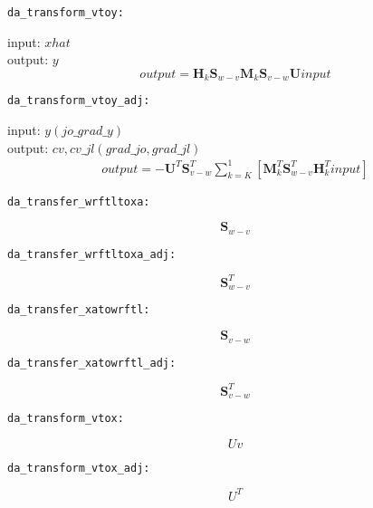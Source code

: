 \documentclass[a4paper,12pt,titlepage]{article}
\begin{document}
\begin{verbatim}
da_transform_vtoy:
\end{verbatim} 
input: $xhat$\\
output: $y$
\[
output=\mathbf{H}_k\mathbf{S}_{w-v}\mathbf{M}_k\mathbf{S}_{v-w}\mathbf{U}input
\]

\begin{verbatim}
da_transform_vtoy_adj:
\end{verbatim} 
input: $y (jo\_grad\_y)$\\
output: $cv ,cv\_jl (grad\_jo, grad\_jl)$
\begin{align*}
output=-\mathbf{U}^T\mathbf{S}^T_{v-w}\sum_{k=K}^1[\mathbf{M}^T_k\mathbf{S}^T_{w-v}\mathbf{H}^T_kinput]
\end{align*}

\begin{verbatim}
da_transfer_wrftltoxa:
\end{verbatim} 
\[
\mathbf{S}_{w-v}
\] 

\begin{verbatim}
da_transfer_wrftltoxa_adj:
\end{verbatim} 
\[
\mathbf{S}^T_{w-v}
\] 

\begin{verbatim}
da_transfer_xatowrftl:
\end{verbatim} 
\[
\mathbf{S}_{v-w}
\] 

\begin{verbatim}
da_transfer_xatowrftl_adj:
\end{verbatim} 
\[
\mathbf{S}^T_{v-w}
\] 

\begin{verbatim}
da_transform_vtox:
\end{verbatim} 
\[
Uv
\] 

\begin{verbatim}
da_transform_vtox_adj:
\end{verbatim} 
\[
U^T
\] 

 
\end{document}
